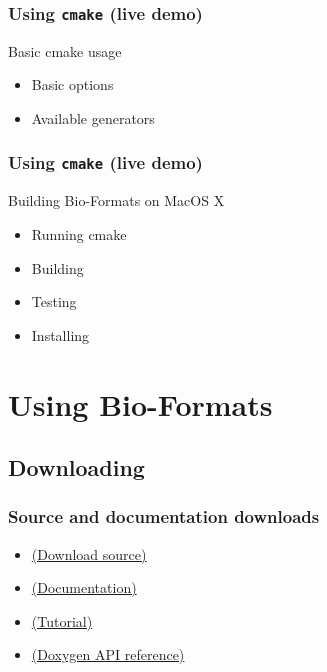 \documentclass{beamer}
\newcommand{\cmd}[1]{\textbf{\texttt{#1}}}
\begin{document}
\begin{frame}
  \frametitle{Using \cmd{cmake} (live demo)}
  \begin{block}{Basic cmake usage}
    \begin{itemize}
      \item Basic options
      \item Available generators
    \end{itemize}
  \end{block}
\end{frame}

\begin{frame}
  \frametitle{Using \cmd{cmake} (live demo)}
  \begin{block}{Building Bio-Formats on MacOS X}
    \begin{itemize}
      \item Running cmake
      \item Building
      \item Testing
      \item Installing
    \end{itemize}
  \end{block}
\end{frame}

\section{Using Bio-Formats}

\subsection{Downloading}

\begin{frame}
  \frametitle{Source and documentation downloads}
  \begin{itemize}
  \item \href{http://downloads.openmicroscopy.org/bio-formats-cpp/}{(Download source)}
  \item \href{http://www.openmicroscopy.org/site/support/bio-formats5.1/developers/index.html\#using-bio-formats-as-a-native-c-library}{(Documentation)}
  \item \href{http://www.openmicroscopy.org/site/support/bio-formats5.1/developers/cpp/tutorial.html}{(Tutorial)}
  \item \href{http://downloads.openmicroscopy.org/bio-formats-cpp/5.1.1/api/namespaces.html}{(Doxygen API reference)}
  \end{itemize}
\end{frame}
\end{document}
